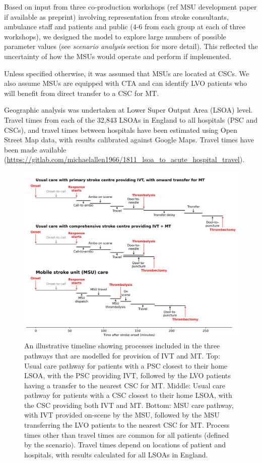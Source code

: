 Based on input from three co-production workshops (ref MSU development paper if available as preprint) involving representation from stroke consultants, ambulance staff and patients and public (4-6 from each group at each of three workshops), we designed the model to explore large numbers of possible parameter values (see \emph{scenario analysis} section for more detail). This reflected the uncertainty of how the MSUs would operate and perform if implemented.

Unless specified otherwise, it was assumed that MSUs are located at CSCs. We also assume MSUs are equipped with CTA and can identify LVO patients who will benefit from direct transfer to a CSC for MT.

Geographic analysis was undertaken at Lower Super Output Area (LSOA) level. Travel times from each of the 32,843 LSOAs in England to all hospitals (PSC and CSCs), and travel times between hospitals have been estimated using Open Street Map data, with results calibrated against Google Maps. Travel times have been made available (\url{https://gitlab.com/michaelallen1966/1811_lsoa_to_acute_hospital_travel}).

\begin{figure}[h]
    \centering
    \includegraphics[width=0.85\linewidth]{images/stroke_treatment.jpg}
    \caption{An illustrative timeline showing processes included in the three pathways that are modelled for provision of IVT and MT. Top: Usual care pathway for patients with a PSC closest to their home LSOA, with the PSC providing IVT, followed by the LVO patients having a transfer to the nearest CSC for MT. Middle: Usual care pathway for patients with a CSC closest to their home LSOA, with the CSC providing both IVT and MT. Bottom: MSU care pathway, with IVT provided on-scene by the MSU, followed by the MSU transferring the LVO patients to the nearest CSC for MT. Process times other than travel times are common for all patients (defined by the scenario). Travel times depend on locations of patient and hospitals, with results calculated for all LSOAs in England.}
    \label{fig:process}
\end{figure}


